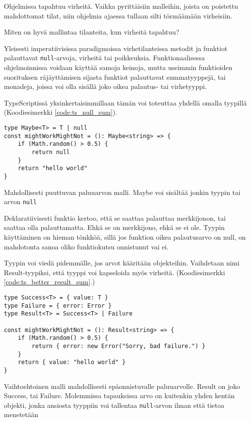 Ohjelmissa tapahtuu virheitä. Vaikka pyrittäisiin malleihin, joista on poistettu mahdottomat tilat, niin ohjelmia ajaessa tullaan silti törmäämään virheisiin.

Miten on hyvä mallintaa tilanteita, kun virheitä tapahtuu?

Yleisesti imperatiivisissa paradigmoissa virhetilanteissa metodit ja funktiot palauttavat \texttt{null}-arvoja, virheitä tai poikkeuksia.
Funktionaalisessa ohjelmoinnissa voidaan käyttää samoja keinoja, mutta useimmin funktioiden suorituksen räjäyttämisen sijasta funktiot palauttavat summatyyppejä, tai monadeja, joissa voi olla sisällä joko oikea palautus- tai virhetyyppi.

TypeScriptissä yksinkertaisimmillaan tämän voi toteuttaa yhdellä omalla tyypillä (Koodiesimerkki \ref{code:ts_null_sum}).

\begin{code}
    \begin{verbatim}
type Maybe<T> = T | null
const mightWorkMightNot = (): Maybe<string> => {
    if (Math.random() > 0.5) {
        return null
    }
    return "hello world"
}
    \end{verbatim}
    \caption{Mahdollisesti puuttuvan paluuarvon malli. Maybe voi sisältää jonkin tyypin tai arvon \texttt{null}}
    \label{code:ts_null_sum}
\end{code}

Deklaratiivisesti funktio kertoo, että se saattaa palauttaa merkkijonon, tai saattaa olla palauttamatta. Ehkä se on merkkijono, ehkä se ei ole.
Tyypin käyttäminen on hieman tönkköä, sillä jos funktion oikea palautusarvo on null, on mahdotonta sanoa oliko funktiokutsu onnistunut vai ei.

Tyypin voi viedä pidemmälle, jos arvot kääritään objekteihin. Vaihdetaan nimi Result-tyypiksi, että tyyppi voi kapseloida myös virheitä. (Koodiesimerkki \ref{code:ts_better_result_sum}.)

\begin{code}
    \begin{verbatim}
type Success<T> = { value: T }
type Failure = { error: Error }
type Result<T> = Success<T> | Failure 

const mightWorkMightNot = (): Result<string> => {
    if (Math.random() > 0.5) {
        return { error: new Error("Sorry, bad failure.") }
    }
    return { value: "hello world" }
}
    \end{verbatim}
    \caption{Vaihtoehtoinen malli mahdollisesti epäonnistuvalle paluuarvolle. Result on joko Success, tai Failure. Molemmissa tapauksissa arvo on kuitenkin yhden kentän objekti, jonka ansiosta tyyppiin voi tallentaa \texttt{null}-arvon ilman että tietoa menetetään}
    \label{code:ts_better_result_sum}
\end{code}


